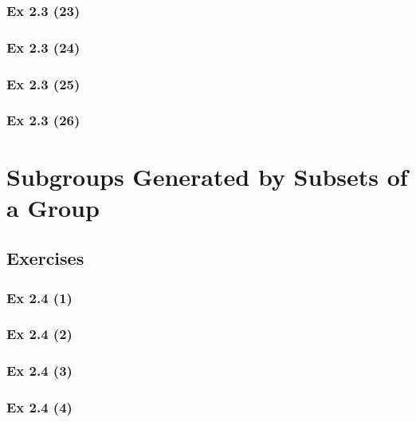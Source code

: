 \subsubsection{Ex 2.3 (23)}\label{sec:Ex_2.3.23}

\subsubsection{Ex 2.3 (24)}\label{sec:Ex_2.3.24}

\subsubsection{Ex 2.3 (25)}\label{sec:Ex_2.3.25}

\subsubsection{Ex 2.3 (26)}\label{sec:Ex_2.3.26}

\newpage		%

\section{Subgroups Generated by Subsets of a Group}\label{sec:2.4}
\subsection*{Exercises}\label{sec:2.4_Exercises}

\subsubsection{Ex 2.4 (1)}\label{sec:Ex_2.4.1}

\subsubsection{Ex 2.4 (2)}\label{sec:Ex_2.4.2}

\subsubsection{Ex 2.4 (3)}\label{sec:Ex_2.4.3}

\subsubsection{Ex 2.4 (4)}\label{sec:Ex_2.4.4}

